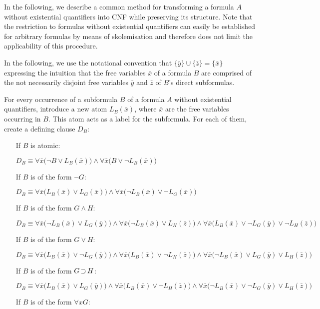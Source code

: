 In the following, we describe a common method for transforming a formula $A$ without existential quantifiers into CNF while preserving its structure.
Note that the restriction to formulas without existential quantifiers can easily be established for arbitrary formulas by means of skolemisation and therefore does not limit the applicability of this procedure.

In the following, we use the notational convention that $\{\bar y\} \cup \{\bar z\} = \{\bar x\}$ expressing the intuition that the free variables $\bar x$ of a formula $B$ are comprised of the not necessarily disjoint free variables  $\bar y$ and $\bar z$ of $B$'s direct subformulas.

\begin{defi}
	For every occurrence of a subformula $B$ of a formula $A$ without existential quantifiers, introduce a new atom $L_B(\bar x)$, where $\bar x$ are the free variables occurring in $B$.
	This atom acts as a label for the subformula. 
For each of them, create a defining clause $D_B$:

\begin{itemize}
	\item[If $B$ is atomic:]~

		$D_B\equiv \forall \bar x \big(\lnot B \lor L_B(\bar x)\big) \land \forall \bar x \big(B \lor \lnot L_B(\bar x)\big)  $
	\item[If $B$ is of the form $\lnot G$:]~

		$D_B\equiv \forall \bar x \big(L_B(\bar x) \lor L_G(\bar x)\big) \land \forall \bar x \big(\lnot L_B(\bar x) \lor \lnot L_G(\bar x)\big)$
	\item[If $B$ is of the form $G \land H$:]~

		$D_B\equiv \forall \bar x \big(\lnot L_B(\bar x) \lor L_G(\bar y)\big) \land \forall \bar x \big(\lnot L_B(\bar x) \lor L_H(\bar z)\big) \land \forall \bar x \big(L_B(\bar x) \lor \lnot L_G(\bar y) \lor \lnot L_H(\bar z)\big)  $
	\item[If $B$ is of the form $G \lor H$:]~

		$D_B\equiv \forall \bar x \big(L_B(\bar x) \lor \lnot L_G(\bar y)\big) \land \forall \bar x \big(L_B(\bar x) \lor \lnot L_H(\bar z)\big) \land \forall \bar x \big(\lnot L_B(\bar x) \lor L_G(\bar y) \lor L_H(\bar z)\big)$
	\item[If $B$ is of the form $G \operatorname{\supset} H$:]~

		$D_B\equiv \forall \bar x \big(L_B(\bar x) \lor L_G(\bar y)\big) \land
		\forall \bar x \big(L_B(\bar x) \lor \lnot L_H(\bar z)\big) \land \forall \bar x \big(\lnot L_B(\bar x) \lor \lnot L_G(\bar y) \lor L_H(\bar z)\big)  $
	\item[If $B$ is of the form $\forall x G$:]~


\end{itemize}
\end{defi}
